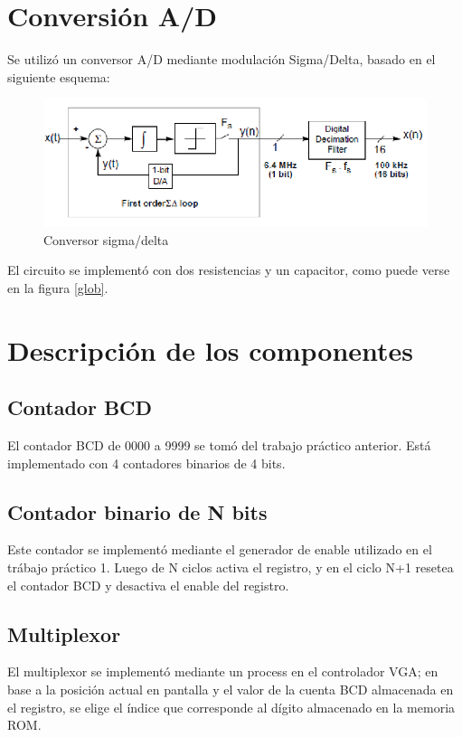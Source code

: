 \documentclass[a4paper,10pt]{article}
\begin{document}
\section{Conversión A/D}

Se utilizó un conversor A/D mediante modulación Sigma/Delta, basado en el siguiente esquema:
	\begin{figure}[h]
		\centering
		\includegraphics[width=13cm]{img/sd.png}
		\caption{Conversor sigma/delta}
	\end{figure}

El circuito se implementó con dos resistencias y un capacitor, como puede verse en la figura \ref{glob}.

\section{Descripción de los componentes}
\subsection{Contador BCD}
El contador BCD de 0000 a 9999 se tomó del trabajo práctico anterior. Está implementado con 4 contadores binarios de 4 bits.

\subsection{Contador binario de N bits}\label{gen}
Este contador se implementó mediante el generador de enable utilizado en el trábajo práctico 1. Luego de N ciclos activa el registro, y en
el ciclo N+1 resetea el contador BCD y desactiva el enable del registro.

\subsection{Multiplexor}
El multiplexor se implementó mediante un process en el controlador VGA; en base a la posición actual en pantalla y el valor de la cuenta BCD almacenada en el registro, se elige el índice que corresponde al dígito almacenado en la memoria ROM.
\end{document}
